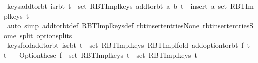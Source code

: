 \begin{isabellebody}
\endisatagproof
{\isafoldproof}%
%
\isadelimproof
\isanewline
%
\endisadelimproof
\isanewline
{}\isamarkupfalse%
\ keys{\isacharunderscore}{\kern0pt}add{\isacharunderscore}{\kern0pt}to{\isacharunderscore}{\kern0pt}rbt{\isacharcolon}{\kern0pt}\ {\isachardoublequoteopen}is{\isacharunderscore}{\kern0pt}rbt\ t\ {\isasymLongrightarrow}\ set\ {\isacharparenleft}{\kern0pt}RBT{\isacharunderscore}{\kern0pt}Impl{\isachardot}{\kern0pt}keys\ {\isacharparenleft}{\kern0pt}add{\isacharunderscore}{\kern0pt}to{\isacharunderscore}{\kern0pt}rbt\ {\isacharparenleft}{\kern0pt}a{\isacharcomma}{\kern0pt}\ b{\isacharparenright}{\kern0pt}\ t{\isacharparenright}{\kern0pt}{\isacharparenright}{\kern0pt}\ {\isacharequal}{\kern0pt}\ insert\ a\ {\isacharparenleft}{\kern0pt}set\ {\isacharparenleft}{\kern0pt}RBT{\isacharunderscore}{\kern0pt}Impl{\isachardot}{\kern0pt}keys\ t{\isacharparenright}{\kern0pt}{\isacharparenright}{\kern0pt}{\isachardoublequoteclose}\isanewline
%
\isadelimproof
\ \ %
\endisadelimproof
%
\isatagproof
{}\isamarkupfalse%
\ {\isacharparenleft}{\kern0pt}auto\ simp{\isacharcolon}{\kern0pt}\ add{\isacharunderscore}{\kern0pt}to{\isacharunderscore}{\kern0pt}rbt{\isacharunderscore}{\kern0pt}def\ RBT{\isacharunderscore}{\kern0pt}Impl{\isachardot}{\kern0pt}keys{\isacharunderscore}{\kern0pt}def\ rbt{\isacharunderscore}{\kern0pt}insert{\isacharunderscore}{\kern0pt}entries{\isacharunderscore}{\kern0pt}None\ rbt{\isacharunderscore}{\kern0pt}insert{\isacharunderscore}{\kern0pt}entries{\isacharunderscore}{\kern0pt}Some\ split{\isacharcolon}{\kern0pt}\ option{\isachardot}{\kern0pt}splits{\isacharparenright}{\kern0pt}%
\endisatagproof
{\isafoldproof}%
%
\isadelimproof
\isanewline
%
\endisadelimproof
\isanewline
{}\isamarkupfalse%
\ keys{\isacharunderscore}{\kern0pt}fold{\isacharunderscore}{\kern0pt}add{\isacharunderscore}{\kern0pt}to{\isacharunderscore}{\kern0pt}rbt{\isacharcolon}{\kern0pt}\ {\isachardoublequoteopen}is{\isacharunderscore}{\kern0pt}rbt\ t{\isacharprime}{\kern0pt}\ {\isasymLongrightarrow}\ set\ {\isacharparenleft}{\kern0pt}RBT{\isacharunderscore}{\kern0pt}Impl{\isachardot}{\kern0pt}keys\ {\isacharparenleft}{\kern0pt}RBT{\isacharunderscore}{\kern0pt}Impl{\isachardot}{\kern0pt}fold\ {\isacharparenleft}{\kern0pt}add{\isacharunderscore}{\kern0pt}option{\isacharunderscore}{\kern0pt}to{\isacharunderscore}{\kern0pt}rbt\ f{\isacharparenright}{\kern0pt}\ t\ t{\isacharprime}{\kern0pt}{\isacharparenright}{\kern0pt}{\isacharparenright}{\kern0pt}\ {\isacharequal}{\kern0pt}\isanewline
\ \ Option{\isachardot}{\kern0pt}these\ {\isacharparenleft}{\kern0pt}f\ {\isacharbackquote}{\kern0pt}\ set\ {\isacharparenleft}{\kern0pt}RBT{\isacharunderscore}{\kern0pt}Impl{\isachardot}{\kern0pt}keys\ t{\isacharparenright}{\kern0pt}{\isacharparenright}{\kern0pt}\ {\isasymunion}\ set\ {\isacharparenleft}{\kern0pt}RBT{\isacharunderscore}{\kern0pt}Impl{\isachardot}{\kern0pt}keys\ t{\isacharprime}{\kern0pt}{\isacharparenright}{\kern0pt}{\isachardoublequoteclose}\isanewline

\end{isabellebody}
